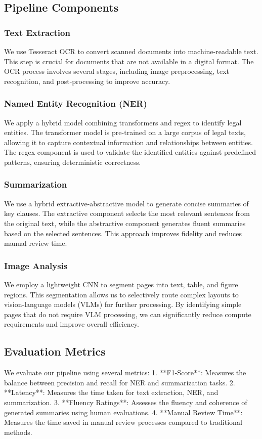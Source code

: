\documentclass[conference]{IEEEtran}
\begin{document}
\subsection{Pipeline Components}
\subsubsection{Text Extraction}
We use Tesseract OCR to convert scanned documents into machine-readable text. This step is crucial for documents that are not available in a digital format. The OCR process involves several stages, including image preprocessing, text recognition, and post-processing to improve accuracy.
\subsubsection{Named Entity Recognition (NER)}
We apply a hybrid model combining transformers and regex to identify legal entities. The transformer model is pre-trained on a large corpus of legal texts, allowing it to capture contextual information and relationships between entities. The regex component is used to validate the identified entities against predefined patterns, ensuring deterministic correctness.
\subsubsection{Summarization}
We use a hybrid extractive-abstractive model to generate concise summaries of key clauses. The extractive component selects the most relevant sentences from the original text, while the abstractive component generates fluent summaries based on the selected sentences. This approach improves fidelity and reduces manual review time.
\subsubsection{Image Analysis}
We employ a lightweight CNN to segment pages into text, table, and figure regions. This segmentation allows us to selectively route complex layouts to vision-language models (VLMs) for further processing. By identifying simple pages that do not require VLM processing, we can significantly reduce compute requirements and improve overall efficiency.
\subsection{Evaluation Metrics}
We evaluate our pipeline using several metrics:
1. **F1-Score**: Measures the balance between precision and recall for NER and summarization tasks.
2. **Latency**: Measures the time taken for text extraction, NER, and summarization.
3. **Fluency Ratings**: Assesses the fluency and coherence of generated summaries using human evaluations.
4. **Manual Review Time**: Measures the time saved in manual review processes compared to traditional methods.
\end{document}
